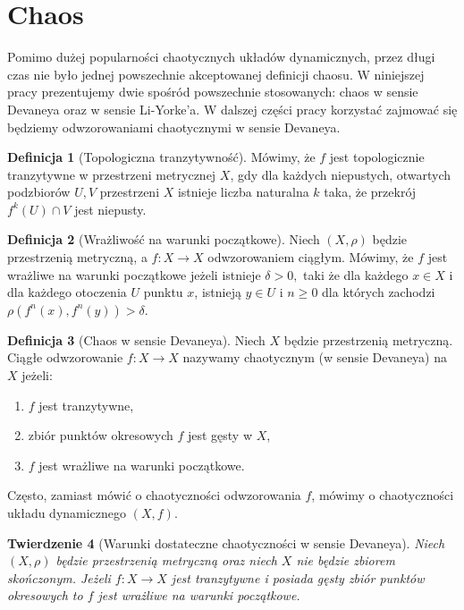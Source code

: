 \documentclass[licencjacka]{pwr_wmat_praca_dyplomowa}
\theoremstyle{plain}
\newtheorem{theorem}{Twierdzenie}
\numberwithin{theorem}{chapter}
\theoremstyle{definition}
\numberwithin{theorem}{chapter}
\newtheorem{definition}[theorem]{Definicja}
\begin{document}
\section{Chaos}


Pomimo dużej popularności chaotycznych układów dynamicznych, przez długi czas nie było jednej powszechnie akceptowanej definicji chaosu. W niniejszej pracy prezentujemy dwie spośród powszechnie stosowanych: chaos w sensie Devaneya oraz w sensie Li-Yorke'a. W dalszej części pracy korzystać zajmować się będziemy odwzorowaniami chaotycznymi w sensie Devaneya.

\begin{definition}[Topologiczna tranzytywność]
\cite{onDeveneyDefinitionOfChaos}
Mówimy, że $f$ jest topologicznie tranzytywne w przestrzeni metrycznej $X$, gdy dla każdych niepustych, otwartych podzbiorów $U, V$ przestrzeni $X$ istnieje liczba naturalna $k$ taka, że przekrój $f^k(U) \cap V$ jest niepusty.
\end{definition}

\begin{definition}[Wrażliwość na warunki początkowe]
\cite{balibrea2003topological}
Niech $(X, \rho)$ będzie przestrzenią metryczną, a $f: X \rightarrow X$ odwzorowaniem ciągłym.
Mówimy, że $f$ jest wrażliwe na warunki początkowe jeżeli  istnieje $\delta > 0,$ taki że dla każdego $x \in X$ i dla każdego otoczenia $U$ punktu $x$, istnieją $y \in U$ i $n \geq 0$ dla których zachodzi $\rho(f^n(x), f^n(y)) > \delta$.
\end{definition}

\begin{definition}[Chaos w sensie Devaneya]
Niech $X$ będzie przestrzenią metryczną. Ciągłe odwzorowanie $f: X \rightarrow X$ nazywamy chaotycznym (w sensie Devaneya) na $X$ jeżeli:
\begin{enumerate}
\item $f$ jest tranzytywne,
\item zbiór punktów okresowych $f$ jest gęsty w $X$,
\item $f$ jest wrażliwe na warunki początkowe.
\end{enumerate}

Często, zamiast mówić o chaotyczności odwzorowania $f$, mówimy o chaotyczności układu dynamicznego $(X, f).$

\end{definition}



\begin{theorem}
[Warunki dostateczne chaotyczności w sensie Devaneya]
\label{warunki_dostateczne_chaotycznosci_devaneya}
\cite{onDeveneyDefinitionOfChaos}
Niech $(X, \rho)$ będzie przestrzenią metryczną oraz niech $X$ nie będzie zbiorem skończonym.
Jeżeli $f: X \rightarrow X$ jest tranzytywne i posiada gęsty zbiór punktów okresowych to $f$ jest wrażliwe na warunki początkowe.
\end{theorem}
\end{document}
